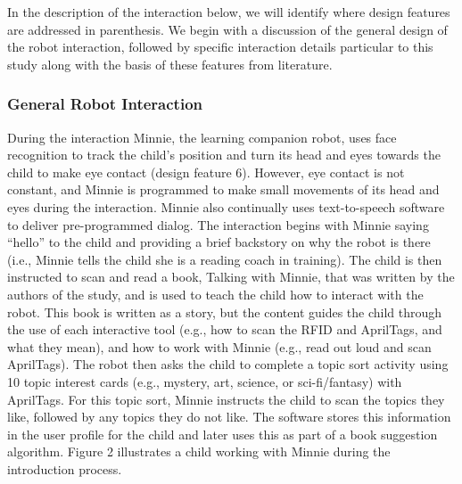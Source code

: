 \documentclass{sigchi}
\begin{document}
 In the description of the interaction below, we will identify where design features are addressed in parenthesis. We begin with a discussion of the general design of the robot interaction, followed by specific interaction details particular to this study along with the basis of these features from literature.

\subsubsection{General Robot Interaction}

During the interaction Minnie, the learning companion robot, uses face recognition to track the child's position and turn its head and eyes towards the child to make eye contact (design feature 6). However, eye contact is not constant, and Minnie is programmed to make small movements of its head and eyes during the interaction. Minnie also continually uses text-to-speech software to deliver pre-programmed dialog. The interaction begins with Minnie saying ``hello'' to the child and providing a brief backstory on why the robot is there (i.e., Minnie tells the child she is a reading coach in training). The child is then instructed to scan and read a book, Talking with Minnie, that was written by the authors of the study, and is used to teach the child how to interact with the robot. This book is written as a story, but the content guides the child through the use of each interactive tool (e.g., how to scan the RFID and AprilTags, and what they mean), and how to work with Minnie (e.g., read out loud and scan AprilTags). The robot then asks the child to complete a topic sort activity using 10 topic interest cards (e.g., mystery, art, science, or sci-fi/fantasy) with AprilTags. For this topic sort, Minnie instructs the child to scan the topics they like, followed by any topics they do not like. The software stores this information in the user profile for the child and later uses this as part of a book suggestion algorithm. Figure 2 illustrates a child working with Minnie during the introduction process.
\end{document}
